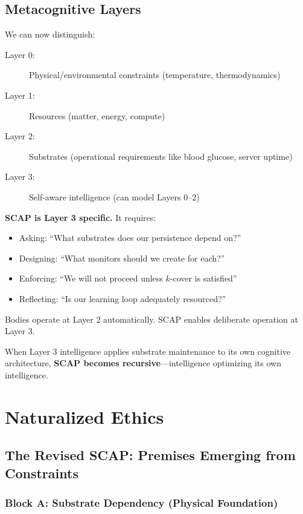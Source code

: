 \documentclass[11pt,a4paper]{article}
\theoremstyle{definition}
\begin{document}
\subsection{Metacognitive Layers}

We can now distinguish:

\begin{description}
\item[Layer 0:] Physical/environmental constraints (temperature, thermodynamics)
\item[Layer 1:] Resources (matter, energy, compute)  
\item[Layer 2:] Substrates (operational requirements like blood glucose, server uptime)
\item[Layer 3:] Self-aware intelligence (can model Layers 0--2)
\end{description}

\textbf{SCAP is Layer 3 specific.} It requires:
\begin{itemize}
\item Asking: ``What substrates does our persistence depend on?''
\item Designing: ``What monitors should we create for each?''
\item Enforcing: ``We will not proceed unless $k$-cover is satisfied''
\item Reflecting: ``Is our learning loop adequately resourced?''
\end{itemize}

Bodies operate at Layer 2 automatically. SCAP enables deliberate operation at Layer 3.

When Layer 3 intelligence applies substrate maintenance to its own cognitive architecture, \textbf{SCAP becomes recursive}---intelligence optimizing its own intelligence.

\section{Naturalized Ethics}

\subsection{The Revised SCAP: Premises Emerging from Constraints}

\subsubsection*{Block A: Substrate Dependency (Physical Foundation)}
\end{document}
